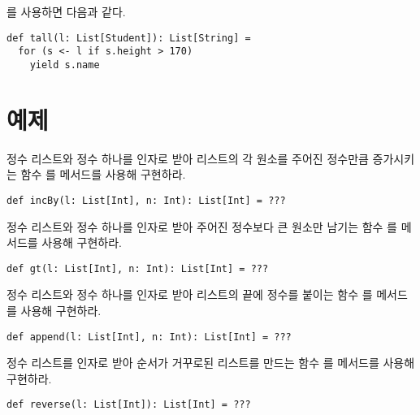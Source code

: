 를 사용하면 다음과 같다.

\begin{verbatim}
def tall(l: List[Student]): List[String] =
  for (s <- l if s.height > 170)
    yield s.name
\end{verbatim}

\section{예제}

\begin{exercise}

정수 리스트와 정수 하나를 인자로 받아 리스트의 각 원소를 주어진 정수만큼
증가시키는 함수 를  메서드를 사용해 구현하라.

\begin{verbatim}
def incBy(l: List[Int], n: Int): List[Int] = ???
\end{verbatim}

\end{exercise}

\begin{exercise}

정수 리스트와 정수 하나를 인자로 받아 주어진 정수보다 큰 원소만 남기는 함수
를  메서드를 사용해 구현하라.

\begin{verbatim}
def gt(l: List[Int], n: Int): List[Int] = ???
\end{verbatim}

\end{exercise}

\begin{exercise}

정수 리스트와 정수 하나를 인자로 받아 리스트의 끝에 정수를 붙이는 함수
를  메서드를 사용해 구현하라.

\begin{verbatim}
def append(l: List[Int], n: Int): List[Int] = ???
\end{verbatim}

\end{exercise}

\begin{exercise}

정수 리스트를 인자로 받아 순서가 거꾸로된 리스트를 만드는 함수 를
 메서드를 사용해 구현하라.

\begin{verbatim}
def reverse(l: List[Int]): List[Int] = ???
\end{verbatim}

\end{exercise}
